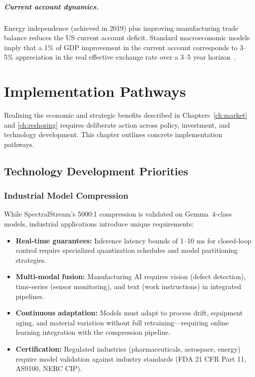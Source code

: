 \documentclass[11pt,a4paper,openright]{book}
\begin{document}
\paragraph{Current account dynamics.}
Energy independence (achieved in 2019) plus improving manufacturing trade balance reduces the US current account deficit. Standard macroeconomic models imply that a 1\% of GDP improvement in the current account corresponds to 3--5\% appreciation in the real effective exchange rate over a 3--5 year horizon~\cite{obstfeld1996foundations}.

\chapter{Implementation Pathways}
\label{ch:implementation}

Realizing the economic and strategic benefits described in Chapters~\ref{ch:market} and \ref{ch:reshoring} requires deliberate action across policy, investment, and technology development. This chapter outlines concrete implementation pathways.

\section{Technology Development Priorities}

\subsection{Industrial Model Compression}

While SpectralStream's 5000:1 compression is validated on Gemma~4-class models, industrial applications introduce unique requirements:

\begin{itemize}
	\item \textbf{Real-time guarantees:} Inference latency bounds of 1--10 ms for closed-loop control require specialized quantization schedules and model partitioning strategies.
	\item \textbf{Multi-modal fusion:} Manufacturing AI requires vision (defect detection), time-series (sensor monitoring), and text (work instructions) in integrated pipelines.
	\item \textbf{Continuous adaptation:} Models must adapt to process drift, equipment aging, and material variation without full retraining---requiring online learning integration with the compression pipeline.
	\item \textbf{Certification:} Regulated industries (pharmaceuticals, aerospace, energy) require model validation against industry standards (FDA 21 CFR Part 11, AS9100, NERC CIP).
\end{itemize}
\end{document}
